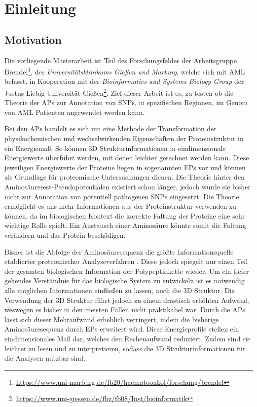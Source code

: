 \chapter{Einleitung}
\label{cha:Einleitung}

\section{Motivation}

Die vorliegende Masterarbeit ist Teil des Forschungsfeldes der Arbeitsgruppe Brendel\footnote{\url{https://www.uni-marburg.de/fb20/haematoonkol/forschung/brendel}}, des \emph{Universitätsklinikums Gießen und Marburg}, welche sich mit \ac{AML} befasst, in Kooperation mit der \emph{Bioinformatics and Systems Biology Group} der Justus-Liebig-Universität Gießen\footnote{\url{https://www.uni-giessen.de/fbz/fb08/Inst/bioinformatik}}. Ziel dieser Arbeit ist es, zu testen ob die Theorie der \ac{APs} zur Annotation von \ac{SNP}s, in spezifischen Regionen, im Genom von \ac{AML} Patienten angewendet werden kann.

Bei den \ac{APs} handelt es sich um eine Methode der Transformation der physikochemischen und wechselwirkenden Eigenschaften der Proteinstruktur in ein Energiemaß. So können 3D Strukturinformationen in eindimensionale Energiewerte überführt werden, mit denen leichter gerechnet werden kann. Diese jeweiligen Energiewerte der Proteine liegen in sogenannten \ac{EP}s vor und können als Grundlage für proteomische Untersuchungen dienen. Die Theorie hinter den Aminosäurerest-Pseudopotentialen existiert schon länger, jedoch wurde sie bisher nicht zur Annotation von potentiell pathogenen \ac{SNP}s eingesetzt. Die Theorie ermöglicht es uns mehr Informationen aus der Proteinstruktur verwenden zu können, da im biologischen Kontext die korrekte Faltung der Proteine eine sehr wichtige Rolle spielt. Ein Austausch einer Aminosäure könnte somit die Faltung verändern und das Protein beschädigen. 

Bisher ist die Abfolge der Aminosäuresequenz die größte Informationsquelle etablierter proteomischer Analyseverfahren \cite{Landels.2015}. Diese jedoch spiegelt nur einen Teil der gesamten biologischen Information der Polypeptidkette wieder. Um ein tiefer gehendes Verständnis für das biologische System zu entwickeln ist es notwendig alle möglichen Informationen einfließen zu lassen, auch die 3D Struktur. Die Verwendung der 3D Struktur führt jedoch zu einem drastisch erhöhten Aufwand, weswegen es bisher in den meisten Fällen nicht praktikabel war. Durch die \ac{APs} lässt sich dieser Mehraufwand erheblich verringert, indem die bisherige Aminosäuresequenz durch \ac{EP}s erweitert wird. Diese Energieprofile stellen ein eindimensionales Maß dar, welches den Rechenaufwand reduziert. Zudem sind sie leichter zu lesen und zu interpretieren, sodass die 3D Strukturinformationen für die Analysen nutzbar sind.

